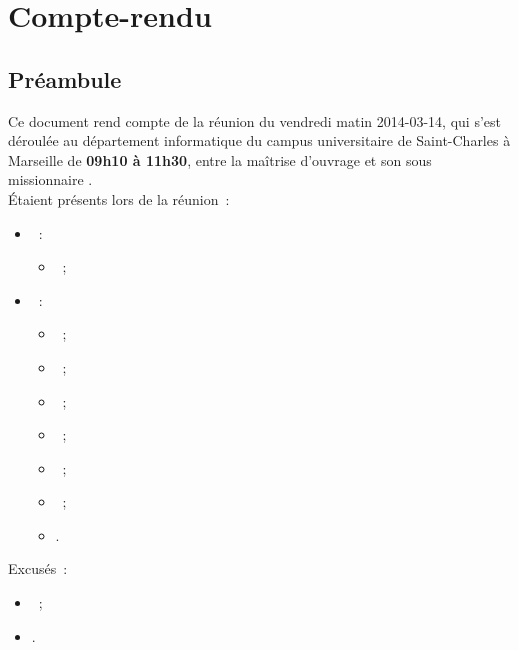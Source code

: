 \documentclass[11pt,fleqn]{report}
\begin{document}
\ZMakeCover


\chapter*{Compte-rendu}
\setcounter{chapter}{1}

\section{Préambule}
Ce document rend compte de la réunion du vendredi matin 2014-03-14, qui s'est déroulée au département informatique du campus universitaire de Saint-Charles à Marseille de \textbf{09h10 à 11h30}, entre la maîtrise d'ouvrage \mo et son sous missionnaire \amo.
\\
Étaient présents lors de la réunion~:
\begin{itemize}
	\item \mo~:
	\begin{itemize}
		\item \Agopian~;
	\end{itemize}
	\item \amo~:
	\begin{itemize}
		\item \Cadon~;
		\item \Julien~;
		\item \Lericolais~;
		\item \Mezelle~;
		\item \Pachy~;
		\item \SuangaWeto~;
		\item \Toure.
	\end{itemize}
\end{itemize}
Excusés~:
\begin{itemize}
	\item \Balde~;
	\item \Gairoard.
\end{itemize}
\end{document}
